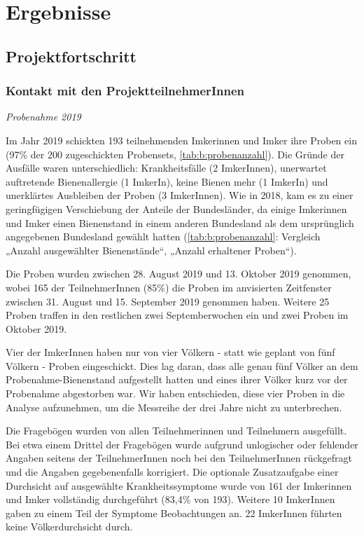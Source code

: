 \section{Ergebnisse}

\subsection{Projektfortschritt}
\subsubsection{Kontakt mit den ProjektteilnehmerInnen}

\textit{Probenahme 2019}

Im Jahr 2019 schickten 193 teilnehmenden Imkerinnen und Imker ihre Proben ein (97\% der 200 zugeschickten Probensets, \cref{tab:b:probenanzahl}). Die Gründe der Ausfälle waren unterschiedlich: Krankheitsfälle (2 ImkerInnen), unerwartet auftretende Bienenallergie (1 ImkerIn), keine Bienen mehr (1 ImkerIn) und unerklärtes Ausbleiben der Proben (3 ImkerInnen). Wie in 2018, kam es zu einer geringfügigen Verschiebung der Anteile der Bundesländer, da einige Imkerinnen und Imker einen Bienenstand in einem anderen Bundesland als dem ursprünglich angegebenen Bundesland gewählt hatten (\cref{tab:b:probenanzahl}: Vergleich „Anzahl ausgewählter Bienenstände“, „Anzahl erhaltener Proben“).

Die Proben wurden zwischen 28. August 2019 und 13. Oktober 2019 genommen, wobei 165 der TeilnehmerInnen (85\%) die Proben im anvisierten Zeitfenster zwischen 31. August und 15. September 2019 genommen haben. Weitere 25 Proben traffen in den restlichen zwei Septemberwochen ein und zwei Proben im Oktober 2019.

Vier der ImkerInnen haben nur von vier Völkern - statt wie geplant von fünf Völkern - Proben eingeschickt. Dies lag daran, dass alle genau fünf Völker an dem Probenahme-Bienenstand aufgestellt hatten und eines ihrer Völker kurz vor der Probenahme abgestorben war. Wir haben entschieden, diese vier Proben in die Analyse aufzunehmen, um die Messreihe der drei Jahre nicht zu unterbrechen.

Die Fragebögen wurden von allen Teilnehmerinnen und Teilnehmern ausgefüllt. Bei etwa einem Drittel der Fragebögen wurde aufgrund unlogischer oder fehlender Angaben seitens der TeilnehmerInnen noch bei den TeilnehmerInnen rückgefragt und die Angaben gegebenenfalls korrigiert. Die optionale Zusatzaufgabe einer Durchsicht auf ausgewählte Krankheitssymptome wurde von 161 der Imkerinnen und Imker vollständig durchgeführt (83,4\% von 193). Weitere 10 ImkerInnen gaben zu einem Teil der Symptome Beobachtungen an. 22 ImkerInnen führten keine Völkerdurchsicht durch.


